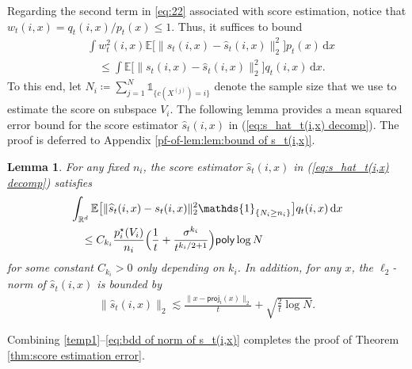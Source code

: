 \documentclass{article}
\newcommand{\ind}{\mathds{1}}
\newcommand{\defn}{\coloneqq}
\newcommand{\bE}{\mathbb{E}}
\newcommand{\diff}{\,\mathrm{d}}
\newcommand{\polylog}{\mathsf{poly}\log}
\newcommand{\proj}{\mathsf{proj}}
\theoremstyle{plain}
\newtheorem{lemma}{\bf Lemma}
\theoremstyle{remark}
\begin{document}
Regarding the second term in \eqref{eq:22} associated with score estimation, notice that $w_t(i,x) = q_t(i,x)/p_t(x) \leq 1$. Thus, it suffices to bound
    \begin{align*}
        &\int w_t^2(i,x) \bE\big[\| s_t(i,x) - \widehat{s}_t(i,x) \|_2^2 \big] p_t(x) \diff x \\
        & \quad \leq \int \bE\big[\| s_t(i,x) - \widehat{s}_t(i,x) \|_2^2 \big] q_t(i,x) \diff x.
    \end{align*}
To this end, let $N_i\defn \sum_{j=1}^N \ind_{\{c(X^{(j)})=i\}}$ denote the sample size that we use to estimate the score on subspace $V_i$. The following lemma provides a mean squared error bound for the score estimator $\widehat{s}_t(i,x)$ in (\ref{eq:s_hat_t(i,x) decomp}). The proof is deferred to Appendix \ref{pf-of-lem:lem:bound of s_t(i,x)}.
\begin{lemma}
    \label{lem:bound of s_t(i,x)}
    For any fixed $n_i$, the score estimator $\widehat{s}_t(i,x)$ in (\ref{eq:s_hat_t(i,x) decomp}) satisfies
    \begin{align}
        &\int_{\mathbb{R}^d} \mathbb{E}\big[\| \widehat{s}_t(i,x) - s_t(i,x)\|_2^2 \ind_{\{N_i \geq n_i \}}\big] q_t(i,x) \diff x \notag \\
        &\quad \leq C_{k_i} \frac{p_i^\star(V_i)}{n_i}\Big( \frac{1}{t}+\frac{\sigma^{k_i}}{t^{k_i/2+1}}\Big)\polylog N  \label{eq:bdd of s_t(i,x)}
    \end{align}
    for some constant $C_{k_i}>0$ only depending on $k_i$.
    In addition, for any $x$, the $\ell_2$-norm of $\widehat{s}_t(i,x)$ is bounded by
    \begin{align}\label{eq:bdd of norm of s_t(i,x)}
        \| \widehat{s}_t(i,x)\|_2 \lesssim \frac{\|x-\proj_i(x)\|_2}{t} + \sqrt{\frac{2}{t} \log N}.
    \end{align}
\end{lemma}

Combining \eqref{temp1}--\eqref{eq:bdd of norm of s_t(i,x)} completes the proof of Theorem \ref{thm:score estimation error}.
\end{document}
